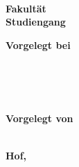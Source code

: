 \begin{titlepage} %
	
	\center %
	
	
	\textbf{\Large \mytitle}\\[0.5cm]

  \vspace{3cm}

  \textbf{\Large \textls{\mydoctype}}\\[0.8cm]
	
  \textbf{\myuniname{}\\
  Fakultät \myfaculty{}\\
  Studiengang \mycourse{}}\\[0.5cm]
	
  \vfill\vfill\vfill

	\begin{minipage}{0.4\textwidth}
		\begin{flushleft}
			\textbf{Vorgelegt bei\\
      \mydocent{}\\
      \myunistreet{} \myuninumber{}\\
      \myunizip{} \myuniplace{}
      }
		\end{flushleft}
	\end{minipage}
	~
	\begin{minipage}{0.4\textwidth}
		\begin{flushright}
			\textbf{
      Vorgelegt von\\
      \myname{}\\
      }
		\end{flushright}
	\end{minipage}
	
  \vfill

	
	\textbf{Hof,~\myreleasedate} %
	
	
\end{titlepage}
\restoregeometry
